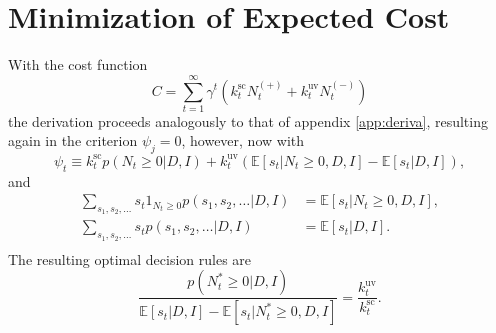 \section{Minimization of Expected Cost}
\label{app:deriv}
With the cost function
\begin{equation}
	C = \sum_{t=1}^{\infty}\gamma^{t}(k^\text{sc}_{t}N_{t}^{(+)}+k_{t}^\text{uv}N_{t}^{(-)})
\end{equation}
the derivation proceeds analogously to that of appendix \ref{app:deriva}, resulting again in the criterion $\psi_j=0$, however, now with
\begin{equation}
	\psi_t\equiv k^\text{sc}_{t}p(N_t\geq 0|D,I)+k_{t}^\text{uv}(\mathbb{E}[s_t|N_{t}\geq 0,D,I]-\mathbb{E}[s_t|D,I]),
\end{equation} 
and
\begin{equation}
	\begin{split}
		\sum_{s_1,s_2,\dots}s_{t}1_{N_{t}\geq 0}p(s_1,s_{2},\dots|D,I)&=\mathbb{E}[s_t|N_{t}\geq 0,D,I],\\
		\sum_{s_1,s_2,\dots}s_{t}p(s_1,s_{2},\dots|D,I)&=\mathbb{E}[s_t|D,I].\\
	\end{split}
\end{equation}
The resulting optimal decision rules are
\begin{equation}
	\frac{p(N_t^*\geq 0|D,I)}{\mathbb{E}[s_t|D,I]-\mathbb{E}[s_t|N_t^*\geq 0,D,I]}=\frac{k_{t}^\text{uv}}{k^\text{sc}_{t}}.
\end{equation}
